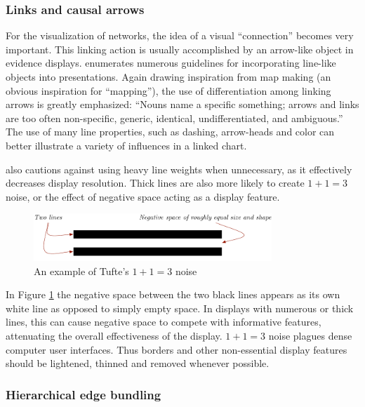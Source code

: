 	\subsubsection{Links and causal arrows}

For the visualization of networks, the idea of a visual ``connection'' becomes very important. This linking action is usually accomplished by an arrow-like object in evidence displays.  enumerates numerous guidelines for incorporating line-like objects into presentations. Again drawing inspiration from map making (an obvious inspiration for ``mapping''), the use of differentiation among linking arrows is greatly emphasized: ``Nouns name a specific something; arrows and links are too often non-specific, generic, identical, undifferentiated, and ambiguous.'' The use of many line properties, such as dashing, arrow-heads and color can better illustrate a variety of influences in a linked chart.

 also cautions against using heavy line weights when unnecessary, as it effectively decreases display resolution. Thick lines are also more likely to create $1 + 1 = 3$ noise, or the effect of negative space acting as a display feature.

\begin{figure}[ht]
\centering
	\includegraphics[width=0.8\textwidth]{figures/1and1equals3}
\caption{An example of Tufte's $1 + 1 = 3$ noise}
\label{fig:1and1equals3}
\end{figure}

In Figure \ref{fig:1and1equals3} the negative space between the two black lines appears as its own white line as opposed to simply empty space. In displays with numerous or thick lines, this can cause negative space to compete with informative features, attenuating the overall effectiveness of the display. $1 + 1 = 3$ noise plagues dense computer user interfaces. Thus borders and other non-essential display features should be lightened, thinned and removed whenever possible.

	\subsubsection{Hierarchical edge bundling}

